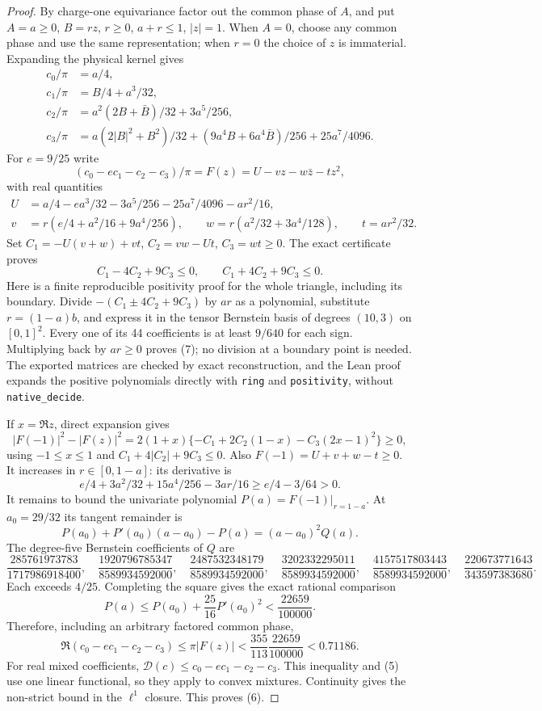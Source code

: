 \documentclass[11pt]{article}
\newcommand{\D}{\mathcal D}
\begin{document}
\begin{proof}
By charge-one equivariance factor out the common phase of $A$, and put
$A=a\ge0$, $B=rz$, $r\ge0$, $a+r\le1$, $|z|=1$.
When $A=0$, choose any common phase and use the same representation; when $r=0$
the choice of $z$ is immaterial. Expanding the physical kernel gives
\begin{align*}
 c_0/\pi&=a/4,\\
 c_1/\pi&=B/4+a^3/32,\\
 c_2/\pi&=a^2(2B+\bar B)/32+3a^5/256,\\
 c_3/\pi&=a(2|B|^2+B^2)/32
 +(9a^4B+6a^4\bar B)/256+25a^7/4096.
\end{align*}
For $e=9/25$ write
\[
 (c_0-ec_1-c_2-c_3)/\pi=F(z)=U-vz-w\bar z-tz^2,
\]
with real quantities
\begin{align*}
 U&=a/4-ea^3/32-3a^5/256-25a^7/4096-ar^2/16,\\
 v&=r(e/4+a^2/16+9a^4/256),\qquad
 w=r(a^2/32+3a^4/128),\qquad t=ar^2/32.
\end{align*}
Set $C_1=-U(v+w)+vt$, $C_2=vw-Ut$, $C_3=wt\ge0$.
The exact certificate proves
\[
 C_1-4C_2+9C_3\le0,\qquad C_1+4C_2+9C_3\le0.\tag{7}
\]
Here is a finite reproducible positivity proof for the whole triangle, including
its boundary. Divide $-(C_1\pm4C_2+9C_3)$ by $ar$ as a polynomial, substitute
$r=(1-a)b$, and express it in the tensor Bernstein basis of degrees $(10,3)$
on $[0,1]^2$. Every one of its 44 coefficients is at least $9/640$ for each
sign. Multiplying back by $ar\ge0$ proves (7); no division at a boundary point
is needed. The exported matrices are checked by exact reconstruction, and the
Lean proof expands the positive polynomials directly with \texttt{ring} and
\texttt{positivity}, without \texttt{native\_decide}.

If $x=\Re z$, direct expansion gives
\[
 |F(-1)|^2-|F(z)|^2
 =2(1+x)\{-C_1+2C_2(1-x)-C_3(2x-1)^2\}\ge0,
\]
using $-1\le x\le1$ and $C_1+4|C_2|+9C_3\le0$.
Also $F(-1)=U+v+w-t\ge0$. It increases in $r\in[0,1-a]$:
its derivative is
\[
 e/4+3a^2/32+15a^4/256-3ar/16
 \ge e/4-3/64>0.
\]
It remains to bound the univariate polynomial $P(a)=F(-1)|_{r=1-a}$.
At $a_0=29/32$ its tangent remainder is
\[
 P(a_0)+P'(a_0)(a-a_0)-P(a)=(a-a_0)^2 Q(a).
\]
The degree-five Bernstein coefficients of $Q$ are
\[
 \frac{285761973783}{1717986918400},\quad
 \frac{1920796785347}{8589934592000},\quad
 \frac{2487532348179}{8589934592000},\quad
 \frac{3202332295011}{8589934592000},\quad
 \frac{4157517803443}{8589934592000},\quad
 \frac{220673771643}{343597383680}.
\]
Each exceeds $4/25$. Completing the square gives the exact rational comparison
\[
 P(a)\le P(a_0)+\frac{25}{16}P'(a_0)^2
 <\frac{22659}{100000}.
\]
Therefore, including an arbitrary factored common phase,
\[
 \Re(c_0-ec_1-c_2-c_3)\le\pi|F(z)|
 <\frac{355}{113}\frac{22659}{100000}<0.71186.
\]
For real mixed coefficients,
$\D(c)\le c_0-ec_1-c_2-c_3$. This inequality and (5) use one linear
functional, so they apply to convex mixtures. Continuity gives the non-strict
bound in the $\ell^1$ closure. This proves (6).
\end{proof}
\end{document}
